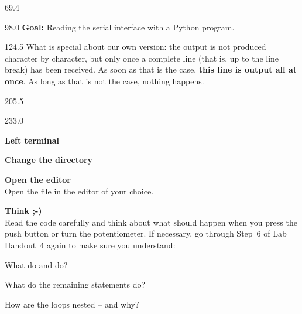 \documentclass{aslab}
\begin{document}
\nextpage
\begin{region}{69.4}
\end{region}

\begin{region}{98.0}
\textbf{Goal:} Reading the serial interface with a Python program.
\end{region}

\begin{region}[pitch=13.5]{124.5}
What is special about our own version: the output is not produced
character by character, but only once a complete line (that is, up to the
line break) has been received. As soon as that is the case, \textbf{this
line is output all at once}. As long as that is not the case, nothing
happens.
\end{region}

\begin{region}{205.5}
\end{region}

\begin{region}[pitch=13.55]{233.0}
\begin{tasks}
\item \textbf{Left terminal}
  \begin{letters}
  \item \textbf{Change the directory}\\
  \item \textbf{Open the editor}\\
    Open the file  in the editor of your choice.
  \item \textbf{Think ;-)}\\
    Read the code carefully and think about what should happen when you
    press the push button or turn the potentiometer. If necessary, go
    through Step~6 of Lab Handout~4 again to make sure you understand:
    \begin{romans}
    \item What do  and  do?
    \item What do the remaining statements do?
    \item How are the loops nested -- and why?
    \end{romans}
  \end{letters}
\end{tasks}
\end{region}
\end{document}
